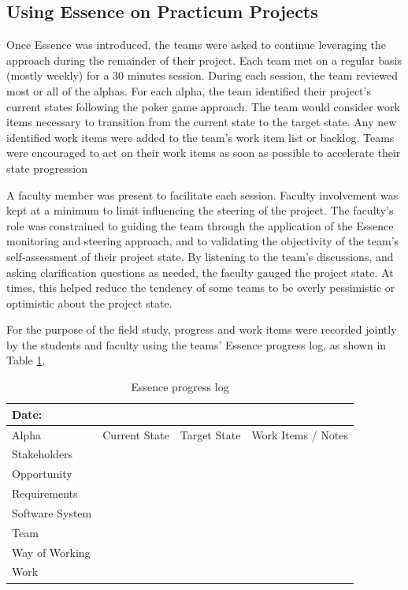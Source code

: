 \subsection{Using Essence on Practicum Projects}
\label{UsingEssenceOnPracticumProjects}
Once Essence was introduced, the teams were asked to continue leveraging the approach during the remainder of their project. Each team met on a regular basis (mostly weekly) for a 30 minutes session. During each session, the team reviewed most or all of the alphas. For each alpha, the team identified their project's current states following the poker game approach. The team would consider work items necessary to transition from the current state to the target state. Any new identified work items were added to the team's work item list or backlog. Teams were encouraged to act on their work items as soon as possible to accelerate their state progression

A faculty member was present to facilitate each session. Faculty involvement was kept at a minimum to limit influencing the steering of the project. The faculty's role was constrained to guiding the team through the application of the Essence monitoring and steering approach, and to validating the objectivity of the team's self-assessment of their project state. By listening to the team's discussions, and asking clarification questions as needed, the faculty gauged the project state. At times, this helped reduce the tendency of some teams to be overly pessimistic or optimistic about the project state.

For the purpose of the field study, progress and work items were recorded jointly by the students and faculty using the teams' Essence progress log, as shown in Table \ref{EssenceProgressLog}.

\begin{table}[]
\centering
\caption{Essence progress log}
\renewcommand{\arraystretch}{1.4}
\label{EssenceProgressLog}
\begin{tabular}{|l|l|l|p{3.25in}|}
\hline
\multicolumn{4}{|l|}{Date:}                                         \\ \hline
\hline
Alpha           & Current State & Target State & Work Items / Notes \\
\hline
Stakeholders    &               &              &                    \\ \hline
Opportunity     &               &              &                    \\ \hline
Requirements    &               &              &                    \\ \hline
Software System &               &              &                    \\ \hline
Team            &               &              &                    \\ \hline
Way of Working  &               &              &                    \\ \hline
Work            &               &              &                    \\ \hline
\end{tabular}
\end{table}

